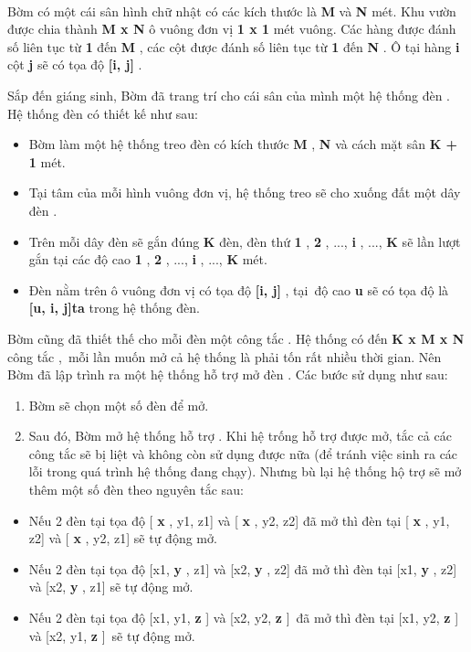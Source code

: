  

Bờm có một cái sân hình chữ nhật có các kích thước là \textbf{ M } và \textbf{ N } mét. Khu vườn được chia thành \textbf{ M x N } ô vuông đơn vị \textbf{ 1 x 1 } mét vuông. Các hàng được đánh số liên tục từ \textbf{ 1 } đến \textbf{ M } , các cột được đánh số liên tục từ \textbf{ 1 } đến \textbf{ N } . Ô tại hàng \textbf{ i } cột \textbf{ j } sẽ có tọa độ \textbf{ [i, j] } .

Sắp đến giáng sinh, Bờm đã trang trí cho cái sân của mình một hệ thống đèn . Hệ thống đèn có thiết kế như sau:
\begin{itemize}
	\item Bờm làm một hệ thống treo đèn có kích thước \textbf{ M } , \textbf{ N } và cách mặt sân \textbf{ K + 1 } mét.
	\item Tại tâm của mỗi hình vuông đơn vị, hệ thống treo sẽ cho xuống đất một dây đèn .
	\item Trên mỗi dây đèn sẽ gắn đúng \textbf{ K } đèn, đèn thứ \textbf{ 1 } , \textbf{ 2 } , ..., \textbf{ i } , ..., \textbf{ K } sẽ lần lượt gắn tại các độ cao \textbf{ 1 } , \textbf{ 2 } , ..., \textbf{ i } , ..., \textbf{ K } mét.
	\item Đèn nằm trên ô vuông đơn vị có tọa độ \textbf{ [i, j] } , tại độ cao \textbf{ u } sẽ có tọa độ là \textbf{ [u, i, j]ta } trong hệ thống đèn.
\end{itemize}
\begin{itemize}
\end{itemize}

Bờm cũng đã thiết thế cho mỗi đèn một công tắc . Hệ thống có đến \textbf{ K x M x N }công tắc , mỗi lần muốn mở cả hệ thống là phải tốn rất nhiều thời gian. Nên Bờm đã lập trình ra một hệ thống hỗ trợ mở đèn . Các bước sử dụng như sau:
\begin{enumerate}
	\item Bờm sẽ chọn một số đèn để mở.
	\item Sau đó, Bờm mở hệ thống hỗ trợ . Khi hệ trống hỗ trợ được mở, tắc cả các công tắc sẽ bị liệt và không còn sử dụng được nữa (để tránh việc sinh ra các lỗi trong quá trình hệ thống đang chạy). Nhưng bù lại hệ thống hộ trợ sẽ mở thêm một số đèn theo nguyên tắc sau:
\end{enumerate}
\begin{itemize}
	\item Nếu 2 đèn tại tọa độ [ \textbf{ x } , y1, z1] và [ \textbf{ x } , y2, z2] đã mở thì đèn tại [ \textbf{ x } , y1, z2] và [ \textbf{ x } , y2, z1] sẽ tự động mở.
	\item Nếu 2 đèn tại tọa độ [x1, \textbf{ y } , z1] và [x2, \textbf{ y } , z2] đã mở thì đèn tại [x1, \textbf{ y } , z2] và [x2, \textbf{ y } , z1] sẽ tự động mở.
	\item Nếu 2 đèn tại tọa độ [x1, y1, \textbf{ z } ] \textbf{} và [x2, y2, \textbf{ z } ] đã mở thì đèn tại [x1, y2, \textbf{ z } ] \textbf{} và [x2, y1, \textbf{ z } ] sẽ tự động mở.
\end{itemize}
\begin{itemize}
\end{itemize}

